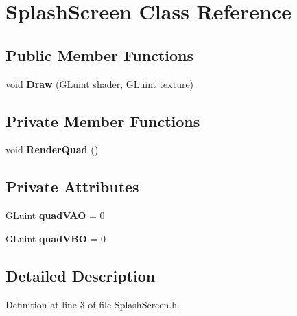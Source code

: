 \hypertarget{class_splash_screen}{}\section{Splash\+Screen Class Reference}
\label{class_splash_screen}
\subsection*{Public Member Functions}
\begin{DoxyCompactItemize}
\item 
void {\bfseries Draw} (G\+Luint shader, G\+Luint texture)\hypertarget{class_splash_screen_a4c3a92d024d53776c82e623b82dffbd7}{}\label{class_splash_screen_a4c3a92d024d53776c82e623b82dffbd7}

\end{DoxyCompactItemize}
\subsection*{Private Member Functions}
\begin{DoxyCompactItemize}
\item 
void {\bfseries Render\+Quad} ()\hypertarget{class_splash_screen_a5eb47fdfa73a41538a9bd3d69d6fd1ea}{}\label{class_splash_screen_a5eb47fdfa73a41538a9bd3d69d6fd1ea}

\end{DoxyCompactItemize}
\subsection*{Private Attributes}
\begin{DoxyCompactItemize}
\item 
G\+Luint {\bfseries quad\+V\+AO} = 0\hypertarget{class_splash_screen_ae225da7ecd5966464e65408f6f2a8b24}{}\label{class_splash_screen_ae225da7ecd5966464e65408f6f2a8b24}

\item 
G\+Luint {\bfseries quad\+V\+BO} = 0\hypertarget{class_splash_screen_a58163632d2aa159c93204777823e017b}{}\label{class_splash_screen_a58163632d2aa159c93204777823e017b}

\end{DoxyCompactItemize}


\subsection{Detailed Description}


Definition at line 3 of file Splash\+Screen.\+h.

